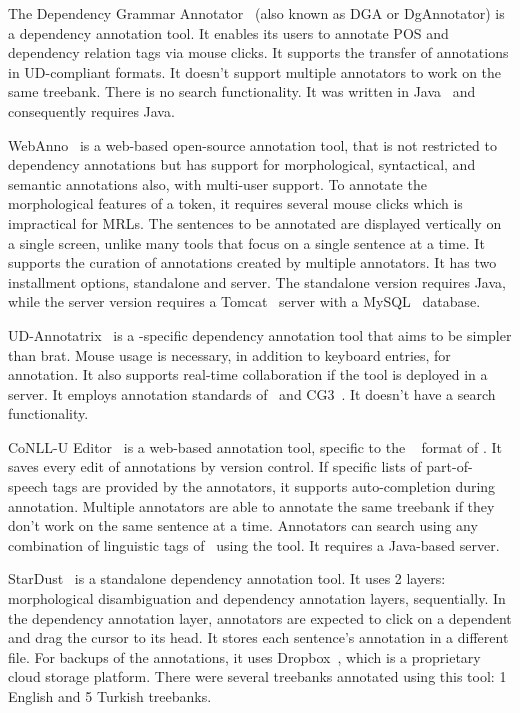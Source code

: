 The Dependency Grammar Annotator~\cite{dgannotator} (also known as DGA or DgAnnotator) is a dependency annotation tool.
It enables its users to annotate POS and dependency relation tags via mouse clicks.
It supports the transfer of annotations in UD-compliant formats.
It doesn't support multiple annotators to work on the same treebank.
There is no search functionality.
It was written in Java~\cite{java} and consequently requires Java.

WebAnno~\cite{webanno} is a web-based open-source annotation tool, that is not restricted to dependency annotations but has support for morphological, syntactical, and semantic annotations also, with multi-user support.
To annotate the morphological features of a token, it requires several mouse clicks which is impractical for MRLs.
The sentences to be annotated are displayed vertically on a single screen, unlike many tools that focus on a single sentence at a time.
It supports the curation of annotations created by multiple annotators.
It has two installment options, standalone and server.
The standalone version requires Java, while the server version requires a Tomcat~\cite{tomcat} server with a MySQL~\cite{mysql} database.

UD-Annotatrix~\cite{ud-annotatrix} is a \ud-specific dependency annotation tool that aims to be simpler than brat.
Mouse usage is necessary, in addition to keyboard entries, for annotation.
It also supports real-time collaboration if the tool is deployed in a server.
It employs annotation standards of \ud\ and CG3~\cite{cg3}.
It doesn't have a search functionality.

CoNLL-U Editor~\cite{conll-u_editor} is a web-based annotation tool, specific to the \conllu~\cite{conll} format of \ud.
It saves every edit of annotations by version control.
If specific lists of part-of-speech tags are provided by the annotators, it supports auto-completion during annotation.
Multiple annotators are able to annotate the same treebank if they don't work on the same sentence at a time.
Annotators can search using any combination of linguistic tags of \ud\ using the tool.
It requires a Java-based server.

StarDust~\cite{stardust} is a standalone dependency annotation tool.
It uses 2 layers: morphological disambiguation and dependency annotation layers, sequentially.
In the dependency annotation layer, annotators are expected to click on a dependent and drag the cursor to its head.
It stores each sentence's annotation in a different file.
For backups of the annotations, it uses Dropbox~\cite{dropbox}, which is a proprietary cloud storage platform.
There were several treebanks annotated using this tool: 1 English and 5 Turkish treebanks.

